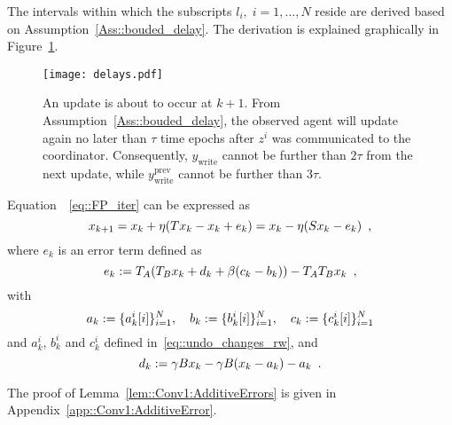 \documentclass[envcountsect]{svjour3}
\begin{document}
The intervals within which the subscripts $l_i,\;i=1,\ldots,N$ reside are derived based on Assumption~\ref{Ass::bouded_delay}. The derivation is explained graphically in Figure~\ref{fig::delays}.

\begin{figure}[!htb]
  \begin{center}
  \texttt{[image: delays.pdf]}
  \caption{An update is about to occur at $k+1$. From Assumption~\ref{Ass::bouded_delay}, the observed agent will update again no later than $\tau$ time epochs after $z^i$ was communicated to the coordinator. Consequently, $y_\mathrm{write}$ cannot be further than $2\tau$ from the next update, while $y_\mathrm{write}^\mathrm{prev}$ cannot be further than $3\tau$.}
  \label{fig::delays}
  \end{center}
\end{figure}



\begin{lemma}\label{lem::Conv1:AdditiveErrors}
Equation~~\eqref{eq::FP_iter} can be expressed as
\begin{equation}{\label{eq::AsyncInertKMerror}}
x_{k+1} = x_k + \eta (Tx_k-x_k+e_k) = x_k - \eta (Sx_k-e_k)\enspace,
\end{equation}
where $e_k$ is an error term defined as
\begin{equation}{\label{eq::ek}}
e_k := T_A(T_Bx_k + d_k + \beta(c_k-b_k))-T_AT_Bx_k\enspace,
\end{equation}
with
\begin{equation}{\label{eq::a_b_c}}
a_k := \{a_k^i[i]\}_{i=1}^N,\quad b_k := \{b_k^i[i]\}_{i=1}^N, \quad c_k := \{c_k^i[i]\}_{i=1}^N
\end{equation}
and $a_k^i$, $b_k^i$ and $c_k^i$ defined in~\eqref{eq::undo_changes_rw}, and
\begin{equation}{\label{eq::ck}}
 d_k := \gamma Bx_k - \gamma B(x_k-a_k) - a_k \enspace.
\end{equation}
\end{lemma}
The proof of Lemma~\ref{lem::Conv1:AdditiveErrors} is given in Appendix~\ref{app::Conv1:AdditiveError}.


\end{document}
